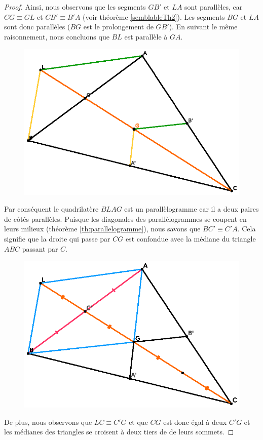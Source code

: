 \documentclass[a4paper,12pt]{article}
\begin{document}
\begin{proof}
Ainsi, nous observons que les segments $GB'$ et $LA$ sont parallèles, car $CG \equiv GL$ et $CB' \equiv B'A$ (voir théorème \ref{semblableTh2}). Les segments $BG$ et $LA$ sont donc parallèles ($BG$ est le prolongement de $GB'$). En suivant le même raisonnement, nous concluons que $BL$ est parallèle à $GA$. 

\begin{figure}[H]
        \centering
        \includegraphics[scale=1.3]{mediane2.eps}
    \end{figure}

Par conséquent le quadrilatère $BLAG$ est un parallèlogramme car il a deux paires de côtés parallèles. Puisque les diagonales des parallèlogrammes se coupent en leurs milieux (théorème \ref{th:parallelogramme}), nous savons que $BC' \equiv C'A$. Cela signifie que la droite qui passe par $CG$ est confondue avec la médiane du triangle $ABC$ passant par $C$.\\

\begin{figure}[H]
        \centering
        \includegraphics[scale=1.3]{mediane3.eps}
    \end{figure}

De plus, nous observons que $LC \equiv C'G$  et que $CG$ est donc égal à deux $C'G$ et les médianes des triangles se croisent à deux tiers de de leurs sommets.
\end{proof}
\end{document}
